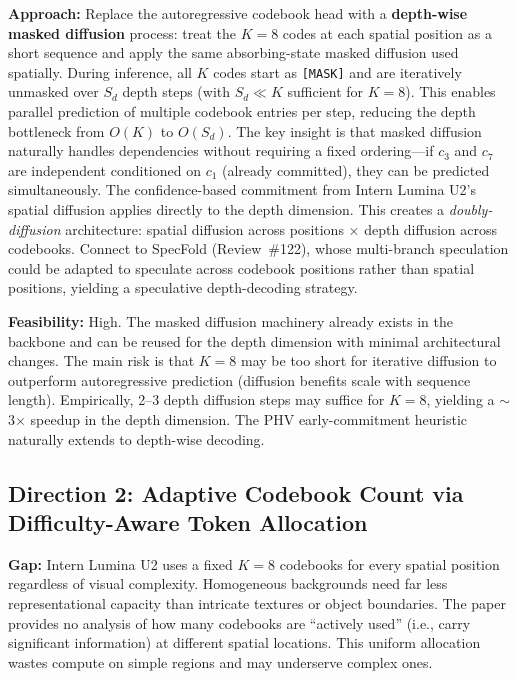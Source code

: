 \documentclass[11pt,a4paper]{article}
\begin{document}
\textbf{Approach:} Replace the autoregressive codebook head with a \textbf{depth-wise masked diffusion} process: treat the $K{=}8$ codes at each spatial position as a short sequence and apply the same absorbing-state masked diffusion used spatially. During inference, all $K$ codes start as \texttt{[MASK]} and are iteratively unmasked over $S_d$ depth steps (with $S_d \ll K$ sufficient for $K{=}8$). This enables parallel prediction of multiple codebook entries per step, reducing the depth bottleneck from $O(K)$ to $O(S_d)$. The key insight is that masked diffusion naturally handles dependencies without requiring a fixed ordering---if $c_3$ and $c_7$ are independent conditioned on $c_1$ (already committed), they can be predicted simultaneously. The confidence-based commitment from Intern Lumina U2's spatial diffusion applies directly to the depth dimension. This creates a \emph{doubly-diffusion} architecture: spatial diffusion across positions $\times$ depth diffusion across codebooks. Connect to SpecFold (Review~\#122), whose multi-branch speculation could be adapted to speculate across codebook positions rather than spatial positions, yielding a speculative depth-decoding strategy.

\textbf{Feasibility:} High. The masked diffusion machinery already exists in the backbone and can be reused for the depth dimension with minimal architectural changes. The main risk is that $K{=}8$ may be too short for iterative diffusion to outperform autoregressive prediction (diffusion benefits scale with sequence length). Empirically, 2--3 depth diffusion steps may suffice for $K{=}8$, yielding a $\sim$3$\times$ speedup in the depth dimension. The PHV early-commitment heuristic naturally extends to depth-wise decoding.

\subsection{Direction 2: Adaptive Codebook Count via Difficulty-Aware Token Allocation}
\textbf{Gap:} Intern Lumina U2 uses a fixed $K{=}8$ codebooks for every spatial position regardless of visual complexity. Homogeneous backgrounds need far less representational capacity than intricate textures or object boundaries. The paper provides no analysis of how many codebooks are ``actively used'' (i.e., carry significant information) at different spatial locations. This uniform allocation wastes compute on simple regions and may underserve complex ones.
\end{document}
